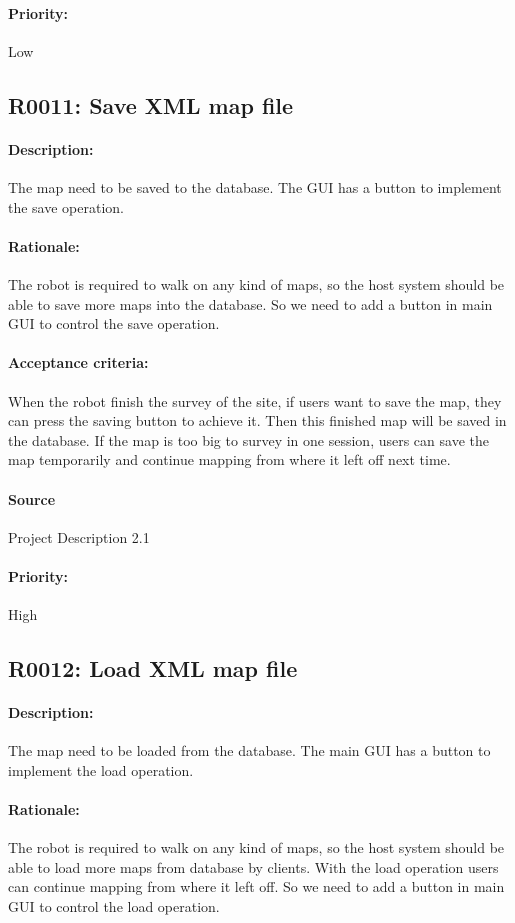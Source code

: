 \documentclass[11pt, a4paper]{report}
\begin{document}
\paragraph{Priority:}
Low



\subsection{R0011: Save XML map file}
\paragraph{Description:}
The map need to be saved to the database. The GUI has a button to implement the save operation. 
\paragraph{Rationale:}
The robot is required to walk on any kind of maps, so the host system should be able to save more maps into the database. So we need to add a button in main GUI to control the save operation.
\paragraph{Acceptance criteria:}
When the robot finish the survey of the site, if users want to save the map, they can press the saving button to achieve it.  Then this finished map will be saved in the database. If the map is too big to survey in one session, users can save the map temporarily and continue mapping from where it left off next time.
\paragraph{Source}
 Project Description 2.1
\paragraph{Priority:}
High




\subsection{R0012: Load XML map file}
\paragraph{Description:}
The map need to be loaded from the database. The main GUI has a button to implement the load operation. 
\paragraph{Rationale:}
The robot is required to walk on any kind of maps, so the host system should be able to load more maps from database by clients. With the load operation users can continue mapping from where it left off.  So we need to add a button in main GUI to control the load operation.
\end{document}
